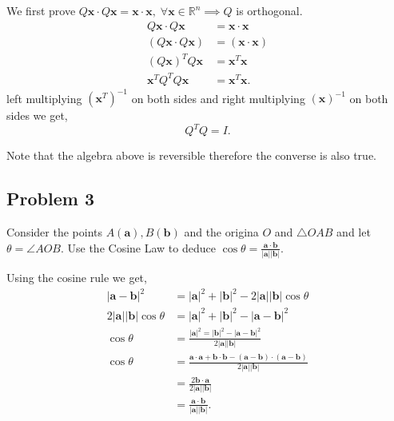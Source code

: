 \begin{solution}
We first prove \( Q \mathbf{x} \cdot Q\mathbf{x} = \mathbf{x} \cdot \mathbf{x}, \; \forall \mathbf{x} \in \mathbb{R}^{n} \implies Q \)  is orthogonal.
\begin{align*}
  Q \mathbf{x} \cdot Q \mathbf{x} &= \mathbf{x} \cdot \mathbf{x} \\
  (Q \mathbf{x} \cdot Q \mathbf{x}) &= (\mathbf{x} \cdot \mathbf{x}) \\
  (Q \mathbf{x})^{T} Q \mathbf{x} &= \mathbf{x}^{T} \mathbf{x}  \\ 
  \mathbf{x}^{T} Q^{T}Q \mathbf{x} &= \mathbf{x}^{T} \mathbf{x}
.\end{align*}
left multiplying \( \left( \mathbf{x}^{T} \right)^{-1} \) on both sides and
right multiplying  \( \left( \mathbf{x} \right)^{-1} \) on both sides we get,
\[
  Q^{T}Q = I
.\] 

Note that the algebra above is reversible therefore the converse is also true.
\end{solution}

\subsection{Problem 3}
Consider the points \( A(\mathbf{a}), B \left( \mathbf{b} \right) \) and the origina \( O \) and \( \bigtriangleup OAB \) and let \( \theta = \angle AOB \). Use 
the Cosine Law to deduce \( \cos  \theta = \frac{\mathbf{a} \cdot \mathbf{b}}{|\mathbf{a} | |\mathbf{b} |}  \).

\begin{solution}
  Using the cosine rule we get, 
  \begin{align*}
    | \mathbf{a} - \mathbf{b} |^{2} &= | \mathbf{a} |^{2} + | \mathbf{b} |^{2} - 2 | \mathbf{a} | | \mathbf{b} | \cos \theta  \\
    2 | \mathbf{a} | | \mathbf{b} | \cos  \theta &= | \mathbf{a} |^{2} + | \mathbf{b} |^{2} - | \mathbf{a} - \mathbf{b} |^{2}     \\
    \cos  \theta  &= \frac{| \mathbf{a} |^{2} = | \mathbf{b} |^{2} - | \mathbf{a} - \mathbf{b} |^{2} }{2 | \mathbf{a} | | \mathbf{b} |} \\
                  \cos  \theta  &= \frac{\mathbf{a} \cdot \mathbf{a} + \mathbf{b} \cdot \mathbf{b} - \left( \mathbf{a - \mathbf{b}} \right) \cdot \left( \mathbf{a} - \mathbf{b} \right)}{2 | \mathbf{a} | | \mathbf{b} |} \\
                  &=   \frac{2\mathbf{b} \cdot \mathbf{a}}{2 | \mathbf{a} | | \mathbf{b} |} \\
                  &= \frac{\mathbf{a} \cdot \mathbf{b}}{| \mathbf{a} | | \mathbf{b} |}
.\end{align*}

\end{solution}

